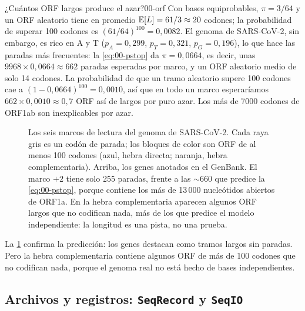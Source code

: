 \begin{simbolos}
\end{simbolos}

\begin{ejemplo}{¿Cuántos ORF largos produce el azar?}{00-orf}
Con bases equiprobables, $\pi=3/64$ y un ORF aleatorio tiene en promedio $\mathbb{E}[L]=61/3\approx20$ codones; la probabilidad de superar 100 codones es $(61/64)^{100}=0{,}0082$. El genoma de SARS-CoV-2, sin embargo, es rico en A y T ($p_A=0{,}299$, $p_T=0{,}321$, $p_G=0{,}196$), lo que hace las paradas más frecuentes: la \cref{eq:00-pstop} da $\pi=0{,}0664$, es decir, unas $\num{9968}\times0{,}0664\approx662$ paradas esperadas por marco, y un ORF aleatorio medio de solo 14 codones. La probabilidad de que un tramo aleatorio supere 100 codones cae a $(1-0{,}0664)^{100}=0{,}0010$, así que en todo un marco esperaríamos $662\times0{,}0010\approx0{,}7$ ORF así de largos por puro azar. Los más de 7000 codones de ORF1ab son inexplicables por azar.
\end{ejemplo}

\begin{figure}[t]
\centering

\caption[Los seis marcos de lectura de SARS-CoV-2]{Los seis marcos de lectura del genoma de SARS-CoV-2. Cada raya gris es un codón de parada; los bloques de color son ORF de al menos 100 codones (azul, hebra directa; naranja, hebra complementaria). Arriba, los genes anotados en el GenBank. El marco $+2$ tiene solo 255 paradas, frente a las $\sim$660 que predice la \cref{eq:00-pstop}, porque contiene los más de 13\,000 nucleótidos abiertos de ORF1a. En la hebra complementaria aparecen algunos ORF largos que no codifican nada, más de los que predice el modelo independiente: la longitud es una pista, no una prueba.}
\label{fig:00-orfs}
\end{figure}

La \cref{fig:00-orfs} confirma la predicción: los genes destacan como tramos largos sin paradas. Pero la hebra complementaria contiene algunos ORF de más de 100 codones que no codifican nada, porque el genoma real no está hecho de bases independientes.


\subsection{Archivos y registros: \texttt{SeqRecord} y \texttt{SeqIO}}

